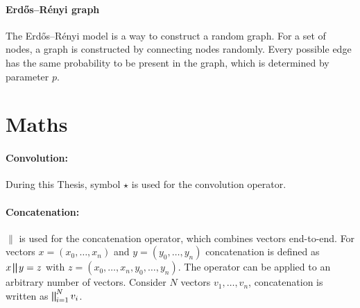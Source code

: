 \paragraph{Erdős–Rényi graph}
The Erdős–Rényi model is a way to construct a random graph.
For a set of nodes, a graph is constructed by connecting nodes randomly. 
Every possible edge has the same probability to be present in the graph, which is determined by parameter $p$.
 
\section{Maths}
\paragraph{Convolution:}
During this Thesis, symbol $\star$ is used for the convolution operator.

\paragraph{Concatenation:}
$\parallel$ is used for the concatenation operator, which combines vectors end-to-end. 
For vectors $x=(x_0, \dots, x_n)$ and $y=(y_0, \dots, y_n)$ concatenation is defined as 
$ x \bigparallel y = z$ with $z=(x_0, \dots, x_n, y_0, \dots, y_n) $. 
The operator can be applied to an arbitrary number of vectors.
Consider $N$ vectors $v_1, \dots, v_n$, concatenation is written as  $\bigparallel^N_{i=1} v_i$.

